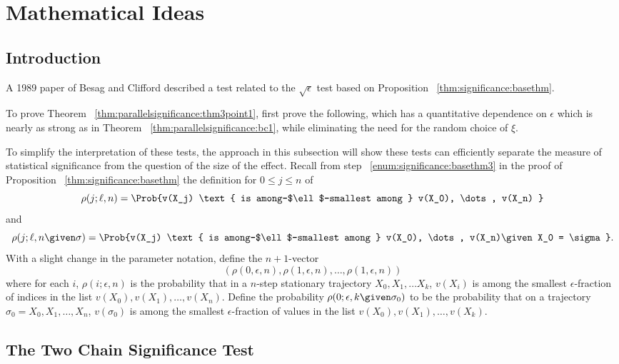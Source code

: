 \documentclass[12pt]{article}
\begin{document}
\section*{Mathematical Ideas}

\subsection*{Introduction}

A 1989 paper of Besag and Clifford
\cite{besag89} described a test related to the \( \sqrt{\epsilon} \)
test based on Proposition~%
\ref{thm:significance:basethm}.

\begin{remark}
    To prove Theorem~%
    \ref{thm:parallelsignificance:thm3point1}, first prove the
    following, which has a quantitative dependence on \( \epsilon \)
    which is nearly as strong as in Theorem~%
    \ref{thm:parallelsignificance:bc1}, while eliminating the need for
    the random choice of \( \xi \).
\end{remark}

To simplify the interpretation of these tests, the approach in this
subsection will show these tests can efficiently separate the measure of
statistical significance from the question of the size of the effect.
Recall from step~%
\ref{enum:significance:basethm3} in the proof of Proposition~%
\ref{thm:significance:basethm} the definition for \( 0 \le j \le n \) of
\[
    \rho(j; \ell, n) = \Prob{v(X_j) \text{ is among-$\ell$-smallest
    among } v(X_0), \dots, v(X_n) }
\] and
\[
  \rho(j; \ell, n \given \sigma) = \Prob{v(X_j) \text{ is
      among-$\ell$-smallest among } v(X_0), \dots, v(X_n)%
    \given X_0 = \sigma}.
\] With a slight change in the parameter notation, define the \( n+1 \)-vector
\[
    (\rho(0, \epsilon, n), \rho(1, \epsilon, n), \dots, \rho(1, \epsilon,
    n))
\] where for each \( i \), \( \rho(i; \epsilon, n) \) is the probability
that in a \( n \)-step stationary trajectory \( X_0, X_1, \dots X_k \), \(
v(X_i) \) is among the smallest \( \epsilon \)-fraction of indices in
the list \( v(X_0), v(X_1), \dots, v(X_n) \).  Define the probability \(
\rho(0; \epsilon, k \given \sigma_0) \) to be the probability that on a
trajectory \( \sigma_0 = X_0, X_1, \dots, X_n \), \( v(\sigma_0) \) is
among the smallest \( \epsilon \)-fraction of values in the list \( v(X_0),
v(X_1), \dots, v(X_k) \).

\subsection*{The Two Chain Significance Test}
\end{document}
